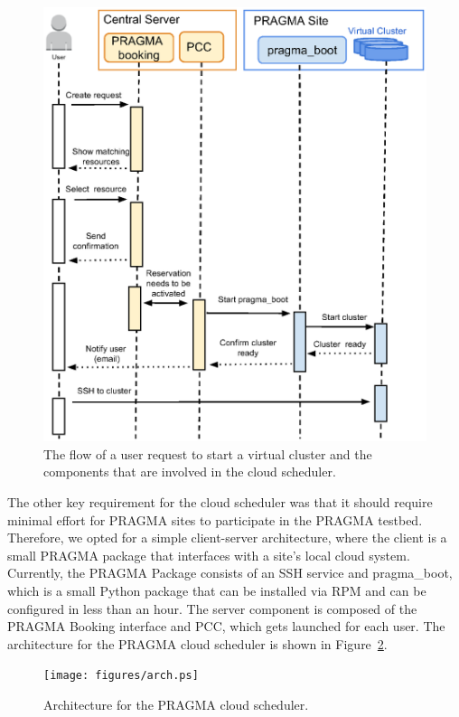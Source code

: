 \documentclass[times]{cpeauth}
\begin{document}
\begin{figure}[htbp]
\begin{center}
\includegraphics[width=\columnwidth]{figures/flow.ps}
\caption{The flow of a user request to start a virtual cluster and the components that are involved in the cloud scheduler.}
\label{Fig:Flow}
\end{center}
\end{figure}

The other key requirement for the cloud scheduler was that it should require minimal effort for PRAGMA sites to participate in the PRAGMA testbed.  Therefore, we opted for a simple client-server architecture, where the client is a small PRAGMA package that interfaces with a site's local cloud system.  Currently, the PRAGMA Package consists of an SSH service and pragma\_boot, which is a small Python package that can be installed via RPM and can be configured in less than an hour.  The server component is composed of the PRAGMA Booking interface and PCC, which gets launched for each user.  The architecture for the PRAGMA cloud scheduler is shown in Figure~\ref{Fig:Arch}.

\begin{figure}[htbp]
\begin{center}
\texttt{[image: figures/arch.ps]}
\caption{Architecture for the PRAGMA cloud scheduler.}
\label{Fig:Arch}
\end{center}
\end{figure}
\end{document}
